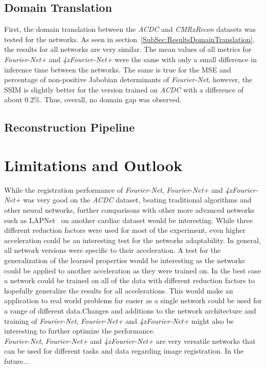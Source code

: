 \subsection{Domain Translation} \label{SubSec:DiscussionDomainTranslation}
First, the domain translation between the \emph{ACDC} and \emph{CMRxRecon} datasets was tested for the networks. As seen in section~\ref{SubSec:ResultsDomainTranslation}, the results for all networks are very similar. The mean values of all metrics for \emph{Fourier-Net+} and \emph{4xFourier-Net+} were the same with only a small difference in inference time between the networks. The same is true for the MSE and percentage of non-positive Jabobian determinants of \emph{Fourier-Net}, however, the SSIM is slightly better for the version trained on \emph{ACDC} with a difference of about $0.2 \%$. Thus, overall, no domain gap was observed.

\subsection{Reconstruction Pipeline} \label{SubSec:DiscussionReconstructionPipeline}


\section{Limitations and Outlook}
While the registration performance of \emph{Fourier-Net}, \emph{Fourier-Net+} and \emph{4xFourier-Net+} was very good on the \emph{ACDC} dataset, beating traditional algorithms and other neural networks, further comparisons with other more advanced networks such as LAPNet~\cite{LAPNet} on another cardiac dataset would be interesting. While three different reduction factors were used for most of the experiment, even higher acceleration could be an interesting test for the networks adaptability. In general, all network versions were specific to their acceleration. A test for the generalization of the learned properties would be interesting as the networks could be applied to another acceleration as they were trained on. In the best case a network could be trained on all of the data with different reduction factors to hopefully generalize the results for all accelerations. This would make an application to real world problems far easier as a single network could be used for a range of different data.Changes and additions to the network architecture and training of \emph{Fourier-Net}, \emph{Fourier-Net+} and \emph{4xFourier-Net+} might also be interesting to further optimize the performance.\\
\emph{Fourier-Net}, \emph{Fourier-Net+} and \emph{4xFourier-Net+} are very versatile networks that can be used for different tasks and data regarding image registration. In the future... 
